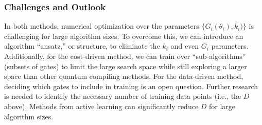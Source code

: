 \documentclass[11pt]{article}
\begin{document}






\subsubsection{Challenges and Outlook} 
In both methods, numerical optimization over the parameters $\{G_i(\theta_i), k_i)\}$ is challenging for large algorithm sizes. To overcome this, we can introduce an algorithm ``ansatz,'' or structure, to eliminate the $k_i$ and even $G_i$ parameters. Additionally, for the cost-driven method, we can train over ``sub-algorithms'' (subsets of gates) to limit the large search space while still exploring a larger space than other quantum compiling methods. %
For the data-driven method, deciding which gates to include in training is an open question. Further research is needed to identify the necessary number of training data points (i.e., the $D$ above). Methods from active learning can significantly reduce $D$ for large algorithm sizes.
\end{document}
